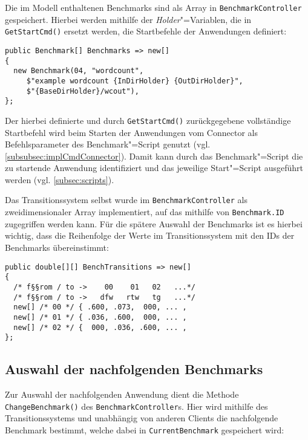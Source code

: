 Die im Modell enthaltenen Benchmarks sind als Array in \texttt{BenchmarkController} gespeichert.
Hierbei werden mithilfe der \emph{Holder}"=Variablen, die in \texttt{GetStartCmd()} ersetzt werden, die Startbefehle der Anwendungen definiert:

\begin{lstlisting}[label=lst:benchmarkDefinition,style=cs,
caption={[Definition der verfügbaren Benchmarks im BenchmarkController]
    Definition der verfügbaren Benchmarks im \texttt{BenchmarkController} (gekürzt)}]
public Benchmark[] Benchmarks => new[]
{
  new Benchmark(04, "wordcount",
     $"example wordcount {InDirHolder} {OutDirHolder}",
     $"{BaseDirHolder}/wcout"),
};
\end{lstlisting}

Der hierbei definierte und durch \texttt{GetStartCmd()} zurückgegebene vollständige Startbefehl wird beim Starten der Anwendungen vom Connector als Befehlsparameter des Benchmark"=Script genutzt (vgl. \cref{subsubsec:implCmdConnector}).
Damit kann durch das Benchmark"=Script die zu startende Anwendung identifiziert und das jeweilige Start"=Script ausgeführt werden (vgl. \cref{subsec:scripts}).

Das Transitionssystem selbst wurde im \texttt{BenchmarkController} als zweidimensionaler Array implementiert, auf das mithilfe von \texttt{Benchmark.ID} zugegriffen werden kann.
Für die spätere Auswahl der Benchmarks ist es hierbei wichtig, dass die Reihenfolge der Werte im Transitionssystem mit den IDs der Benchmarks übereinstimmt:

\begin{lstlisting}[label=lst:transitionSystemImpl,style=cs,
caption={[Implementierung des Transitionssystems im BenchmarkController]
    Implementierung des Transitionssystems im \texttt{BenchmarkController} (gekürzt)}]
public double[][] BenchTransitions => new[]
{
  /* f§§rom / to ->    00    01   02   ...*/
  /* f§§rom / to ->   dfw   rtw   tg   ...*/
  new[] /* 00 */ { .600, .073,  000, ... ,
  new[] /* 01 */ { .036, .600,  000, ... ,
  new[] /* 02 */ {  000, .036, .600, ... ,
};
\end{lstlisting}

\subsection{Auswahl der nachfolgenden Benchmarks}
\label{subsec:selectionNextBenchmark}

Zur Auswahl der nachfolgenden Anwendung dient die Methode \texttt{ChangeBenchmark()} des \texttt{BenchmarkController}s.
Hier wird mithilfe des Transitionssystems und unabhängig von anderen Clients die nachfolgende Benchmark bestimmt, welche dabei in \texttt{CurrentBenchmark} gespeichert wird:

